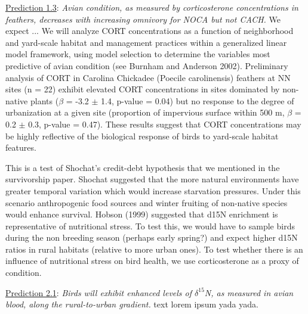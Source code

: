 \documentclass[12pt]{article}
\begin{document}

\noindent \underline{Prediction 1.3}: \textit{Avian condition, as measured by corticosterone concentrations in feathers, decreases with increasing omnivory for NOCA but not CACH.} We expect ...  We will analyze CORT concentrations as a function of neighborhood and yard-scale habitat and management practices within a generalized linear model framework, using model selection to determine the variables most predictive of avian condition (see Burnham and Anderson 2002). Preliminary analysis of CORT in Carolina Chickadee (Poecile carolinensis) feathers at NN sites (n = 22) exhibit elevated CORT concentrations in sites dominated by non-native plants ($\beta$ = -3.2 $\pm$ 1.4, p-value = 0.04) but no response to the degree of urbanization at a given site (proportion of impervious surface within 500 m, $\beta$ = 0.2 $\pm$ 0.3, p-value = 0.47). These results suggest that CORT concentrations may be highly reflective of the biological response of birds to yard-scale habitat features.\par


 This is a test of Shochat’s credit-debt hypothesis that we mentioned in the survivorship paper. Shochat suggested that the more natural environments have greater temporal variation which would increase starvation pressures. Under this scenario anthropogenic food sources and winter fruiting of non-native species would enhance survival. Hobson (1999) suggested that d15N enrichment is representative of nutritional stress. To test this, we would have to sample birds during the non breeding season (perhaps early spring?) and expect higher d15N ratios in rural habitats (relative to more urban ones). To test whether there is an influence of nutritional stress on bird health, we use corticosterone as a proxy of condition. \par


\noindent \underline{Prediction 2.1}: \textit{Birds will exhibit enhanced levels of $\delta^{15}$N, as measured in avian blood, along the rural-to-urban gradient.} 
text lorem ipsum yada yada. \par

\end{document}
